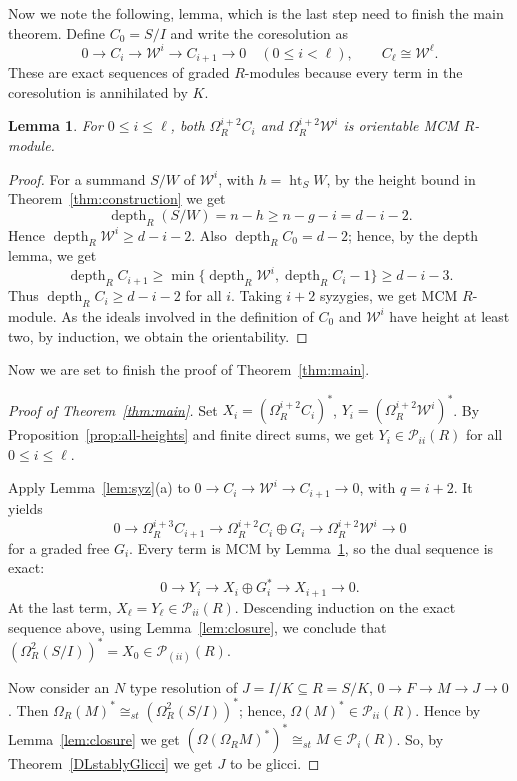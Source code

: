 \documentclass[11pt,letterpaper]{amsart}
\DeclareMathOperator{\heightideal}{ht}
\newcommand{\seq}{\subseteq}
\newcommand{\x}{\xrightarrow{}}
\DeclareMathOperator{\depth}{depth}
\theoremstyle{plain}
\newtheorem{lem}[thm]{Lemma}
\theoremstyle{definition}
\theoremstyle{remark}
\begin{document}
Now we note the following, lemma, which is the last step need to finish the main theorem. Define $C_0=S/I$ and write the coresolution as
\[
 0\x C_i\x\mathcal W^i\x C_{i+1}\x0
 \quad(0\leq i<\ell),\qquad C_\ell\cong\mathcal W^\ell.\]
These are exact sequences of graded $R$-modules because every
term in the coresolution is annihilated by $K$.

\begin{lem}\label{lem:Ci-depth}
For $0\leq i\leq\ell$, both $\Omega_R^{i+2}C_i$ and
$\Omega_R^{i+2}\mathcal W^i$ is orientable MCM $R$-module.
\end{lem}

\begin{proof}
For a summand $S/W$ of $\mathcal W^i$, with $h=\heightideal_S W$, by the height bound in Theorem~\ref{thm:construction} we get
\[
 \depth_R(S/W)=n-h\geq n-g-i=d-i-2.
\]
 Hence
$\depth_R\mathcal W^i\geq d-i-2$.
Also $\depth_R C_0=d-2$; hence, by the depth lemma, we get
\[
 \depth_R C_{i+1}\geq
 \min\{\depth_R\mathcal W^i,\depth_R C_i-1\}
 \geq d-i-3.
\]
Thus $\depth_R C_i\geq d-i-2$ for all $i$.
Taking $i+2$ syzygies, we get MCM $R$-module. As the ideals involved in the definition of $C_0$ and $\mathcal{W}^i$ have height at least two, by induction, we obtain the orientability.
\end{proof}

Now we are set to finish the proof of Theorem~\ref{thm:main}.

\begin{proof}[Proof of Theorem~\ref{thm:main}]
Set $X_i=(\Omega_R^{i+2}C_i)^*$, $Y_i=(\Omega_R^{i+2}\mathcal W^i)^*$.
By Proposition~\ref{prop:all-heights} and finite direct sums, we get $Y_i\in\mathcal{P}_{ii}(R)$ for all $0\leq i\leq\ell$.

Apply Lemma~\ref{lem:syz}(a) to $0\x C_i\x\mathcal{W}^i\x C_{i+1}\x0$, with $q=i+2$.
It yields
\[
 0\x\Omega_R^{i+3}C_{i+1}
 \x\Omega_R^{i+2}C_i\oplus G_i
 \x\Omega_R^{i+2}\mathcal W^i\x0
\]
for a graded free $G_i$.
Every term is MCM by Lemma~\ref{lem:Ci-depth}, so the dual
sequence is exact:
\[0\x Y_i\x X_i\oplus G_i^*\x X_{i+1}\x0.\]
At the last term, $X_\ell=Y_\ell\in\mathcal{P}_{ii}(R)$.
Descending induction on the exact sequence above, using
Lemma~\ref{lem:closure}, we conclude that $(\Omega_R^2(S/I))^*=X_0\in\mathcal{P}_{(ii)}(R)$. 

Now consider an $N$ type resolution of $J=I/K\seq R=S/K$, $0\x F\x M\x J\x 0$. Then $\Omega_R(M)^*\cong_{st}(\Omega^2_R(S/I))^*$; hence, $\Omega(M)^*\in\mathcal{P}_{ii}(R)$. Hence by Lemma~\ref{lem:closure} we get $(\Omega(\Omega_RM)^*)^*\cong_{st} M\in \mathcal{P}_{i}(R)$. So, by Theorem~\ref{DLstablyGlicci} we get $J$ to be glicci. 
\end{proof}
\end{document}
